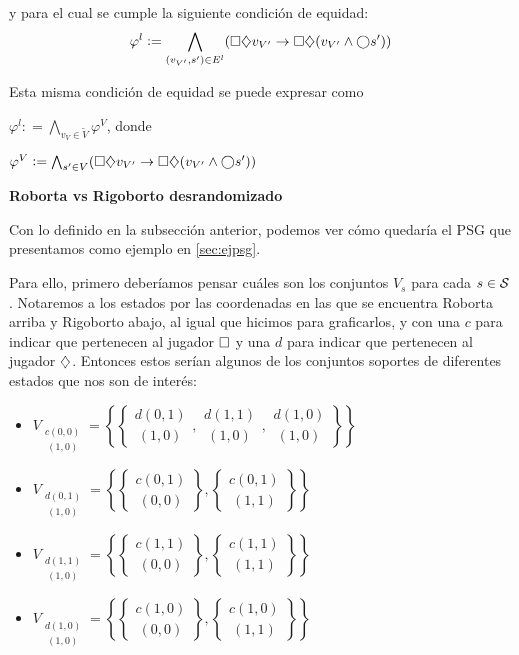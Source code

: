 y para el cual se cumple la siguiente condición de equidad: $$ \varphi^l :=
	\bigwedge_{(v_{V'},s') \in E^l} (\square \diamondsuit v_{V'} \rightarrow \square \diamondsuit
	(v_{V'} \wedge \bigcirc s' )) $$

Esta misma condición de equidad se puede expresar como

\begin{center}
	$ \varphi^l : = \bigwedge_{v_V \in \tilde V} \varphi^V $, donde

	$ \varphi^V := \bigwedge_{s' \in V} (\square \diamondsuit v_{V'} \rightarrow \square \diamondsuit (v_{V'} \wedge \bigcirc s' ))$
\end{center}

\textbf{Roborta vs Rigoborto desrandomizado}

Con lo definido en la subsección anterior, podemos ver cómo quedaría el PSG que
presentamos como ejemplo en \ref{sec:ejpsg}.

Para ello, primero deberíamos pensar cuáles son los conjuntos $V_s$ para cada
$s \in \mathcal{S}$. Notaremos a los estados por las coordenadas en las que se
encuentra Roborta arriba y Rigoborto abajo, al igual que hicimos para
graficarlos, y con una $c$ para indicar que pertenecen al jugador $\square$ y una
$d$ para indicar que pertenecen al jugador $\diamondsuit$. Entonces estos serían
algunos de los conjuntos soportes de diferentes estados que nos son de interés:
\begin{itemize}
	\item $V_{\substack{c(0,0) \\ \ (1,0)}} = \left\{\left\{\substack{d(0,1) \\ \ (1,0)}, \substack{d(1,1) \\ \ (1,0)}, \substack{d(1,0) \\ \ (1,0)}\right\}\right\}$
	\item $V_{\substack{d(0,1) \\ \ (1,0)}} = \left\{\left\{\substack{c(0,1) \\ \ (0,0)}\right\}, \left\{\substack{c(0,1) \\ \ (1,1)}\right\}\right\}$
	\item $V_{\substack{d(1,1) \\ \ (1,0)}} = \left\{\left\{\substack{c(1,1) \\ \ (0,0)}\right\}, \left\{\substack{c(1,1) \\ \ (1,1)}\right\}\right\}$
	\item $V_{\substack{d(1,0) \\ \ (1,0)}} = \left\{\left\{\substack{c(1,0) \\ \ (0,0)}\right\}, \left\{\substack{c(1,0) \\ \ (1,1)}\right\}\right\}$
\end{itemize}

